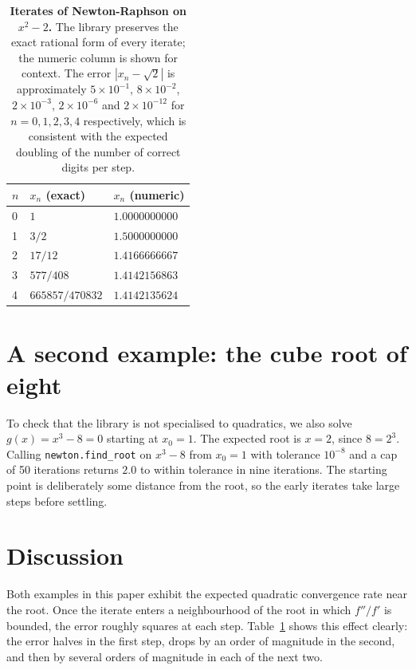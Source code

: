 \documentclass[11pt]{article}
\begin{document}
\begin{table}[h]
\centering
\begin{tabular}{l l l}
\toprule
\(n\) & \(x_n\) (exact) & \(x_n\) (numeric) \\
\midrule
0 & \(1\)               & \(1.0000000000\) \\
1 & \(3/2\)             & \(1.5000000000\) \\
2 & \(17/12\)           & \(1.4166666667\) \\
3 & \(577/408\)         & \(1.4142156863\) \\
4 & \(665857 / 470832\) & \(1.4142135624\) \\
\bottomrule
\end{tabular}
\caption{\textbf{Iterates of Newton-Raphson on \(x^2 - 2\).} The library
preserves the exact rational form of every iterate; the numeric column is
shown for context. The error \(|x_n - \sqrt{2}|\) is approximately
\(5 \times 10^{-1}\), \(8 \times 10^{-2}\), \(2 \times 10^{-3}\),
\(2 \times 10^{-6}\) and \(2 \times 10^{-12}\) for \(n = 0, 1, 2, 3, 4\)
respectively, which is consistent with the expected doubling of the
number of correct digits per step.}
\label{tab:sqrt2}
\end{table}

\section{A second example: the cube root of eight}

To check that the library is not specialised to quadratics, we also solve
\(g(x) = x^3 - 8 = 0\) starting at \(x_0 = 1\). The expected root is
\(x = 2\), since \(8 = 2^3\). Calling
\texttt{newton.find\_root} on \(x^3 - 8\) from \(x_0 = 1\) with
tolerance \(10^{-8}\) and a cap of 50 iterations returns \(2.0\) to
within tolerance in nine iterations. The starting point is deliberately some distance from the
root, so the early iterates take large steps before settling.

\section{Discussion}

Both examples in this paper exhibit the expected
quadratic convergence rate near the root. Once the iterate enters a
neighbourhood of the root in which \(f''/f'\) is bounded, the error
roughly squares at each step. Table~\ref{tab:sqrt2} shows this effect
clearly: the error halves in the first step, drops by an order of
magnitude in the second, and then by several orders of magnitude in each
of the next two.
\end{document}
